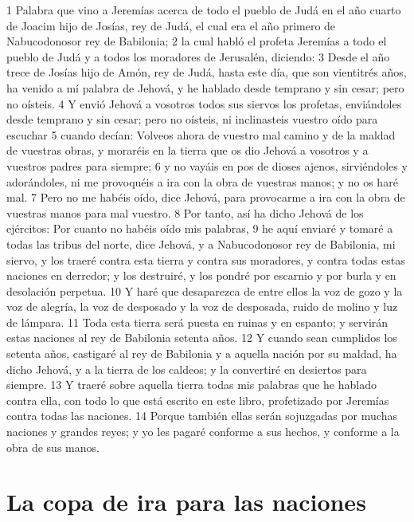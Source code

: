 1 Palabra que vino a Jeremías acerca de todo el pueblo de Judá en el año cuarto de Joacim hijo de Josías, rey de Judá, el cual era el año primero de Nabucodonosor rey de Babilonia;
2 la cual habló el profeta Jeremías a todo el pueblo de Judá y a todos los moradores de Jerusalén, diciendo:
3 Desde el año trece de Josías hijo de Amón, rey de Judá, hasta este día, que son vientitrés años, ha venido a mí palabra de Jehová, y he hablado desde temprano y sin cesar; pero no oísteis.
4 Y envió Jehová a vosotros todos sus siervos los profetas, enviándoles desde temprano y sin cesar; pero no oísteis, ni inclinasteis vuestro oído para escuchar
5 cuando decían: Volveos ahora de vuestro mal camino y de la maldad de vuestras obras, y moraréis en la tierra que os dio Jehová a vosotros y a vuestros padres para siempre;
6 y no vayáis en pos de dioses ajenos, sirviéndoles y adorándoles, ni me provoquéis a ira con la obra de vuestras manos; y no os haré mal.
7 Pero no me habéis oído, dice Jehová, para provocarme a ira con la obra de vuestras manos para mal vuestro.
8 Por tanto, así ha dicho Jehová de los ejércitos: Por cuanto no habéis oído mis palabras,
9 he aquí enviaré y tomaré a todas las tribus del norte, dice Jehová, y a Nabucodonosor rey de Babilonia, mi siervo, y los traeré contra esta tierra y contra sus moradores, y contra todas estas naciones en derredor; y los destruiré, y los pondré por escarnio y por burla y en desolación perpetua.
10 Y haré que desaparezca de entre ellos la voz de gozo y la voz de alegría, la voz de desposado y la voz de desposada, ruido de molino y luz de lámpara. 
11 Toda esta tierra será puesta en ruinas y en espanto; y servirán estas naciones al rey de Babilonia setenta años. 
12 Y cuando sean cumplidos los setenta años, castigaré al rey de Babilonia y a aquella nación por su maldad, ha dicho Jehová, y a la tierra de los caldeos; y la convertiré en desiertos para siempre.
13 Y traeré sobre aquella tierra todas mis palabras que he hablado contra ella, con todo lo que está escrito en este libro, profetizado por Jeremías contra todas las naciones.
14 Porque también ellas serán sojuzgadas por muchas naciones y grandes reyes; y yo les pagaré conforme a sus hechos, y conforme a la obra de sus manos.

\section*{La copa de ira para las naciones}

